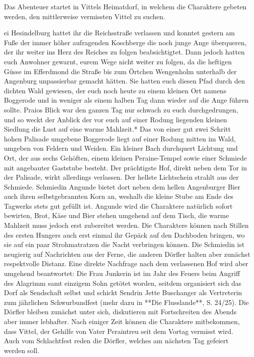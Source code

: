 \platz
Das Abenteuer startet in Vittels Heimatdorf, in welchem die Charaktere gebeten werden, den mittlerweise vermissten Vittel zu suchen. 


ei Hesindelburg hattet ihr die Reichsstraße verlassen und konntet gestern am Fuße der immer höher aufragenden Koschberge die noch junge Ange überqueren, der ihr weiter ins Herz des Reiches zu folgen beabsichtigtet. Dann jedoch hatten euch Anwohner gewarnt, eurem Wege nicht weiter zu folgen, da die heftigen Güsse im Efferdmond die Straße bis zum Örtchen Wengenholm unterhalb der Angenburg unpassierbar gemacht hätten. Sie hatten euch diesen Pfad durch den dichten Wald gewiesen, der euch noch heute zu einem kleinen Ort namens Boggerode und in weniger als einem halben Tag dann wieder auf die Ange führen sollte. Praios Blick war den ganzen Tag nur schwach zu euch durchgedrungen, und so weckt der Anblick der vor euch auf einer Rodung liegenden kleinen Siedlung die Lust auf eine warme Mahlzeit.*
\platz
Das von einer gut zwei Schritt hohen Palisade umgebene Boggerode liegt auf einer Rodung mitten im Wald, umgeben von Feldern und Weiden. Ein kleiner Bach durchquert Lichtung und Ort, der aus sechs Gehöften, einem kleinen Peraine-Tempel sowie einer Schmiede mit angebauter Gaststube besteht. Der prächtigste Hof, direkt neben dem Tor in der Palisade, wirkt allerdings verlassen. Der hellste Lichtschein strahlt aus der Schmiede. Schmiedin Angunde bietet dort neben dem hellen Angenburger Bier auch ihren selbstgebrannten Korn an, weshalb die kleine Stube am Ende des Tagwerks stets gut gefüllt ist. Angunde wird die Charaktere natürlich sofort bewirten, Brot, Käse und Bier stehen umgehend auf dem Tisch, die warme Mahlzeit muss jedoch erst zubereitet werden. Die Charaktere können nach Stillen des ersten Hungers auch erst einmal ihr Gepäck auf den Dachboden bringen, wo sie auf ein paar Strohmatratzen die Nacht verbringen können. Die Schmiedin ist neugierig auf Nachrichten aus der Ferne, die anderen Dörfler halten aber zunächst respektvolle Distanz. Eine direkte Nachfrage nach dem verlassenen Hof wird aber umgehend beantwortet: Die Frau Junkerin ist im Jahr des Feuers beim Angriff des Alagrimm samt einzigem Sohn getötet worden, seitdem organisiert sich das Dorf als Sendschaft selbst und schickt Sendrin Jette Buschanger als Vertreterin zum jährlichen Schwurbundfest (mehr dazu in **Die Flusslande**, S. 24/25).
\platz
Die Dörfler bleiben zunächst unter sich, diskutieren mit Fortschreiten des Abends aber immer lebhafter. Nach einiger Zeit können die Charaktere mitbekommen, dass Vittel, der Gehilfe von Vater Peraintreu seit dem Vortag vermisst wird. Auch vom Schlachtfest reden die Dörfler, welches am nächsten Tag gefeiert werden soll.


